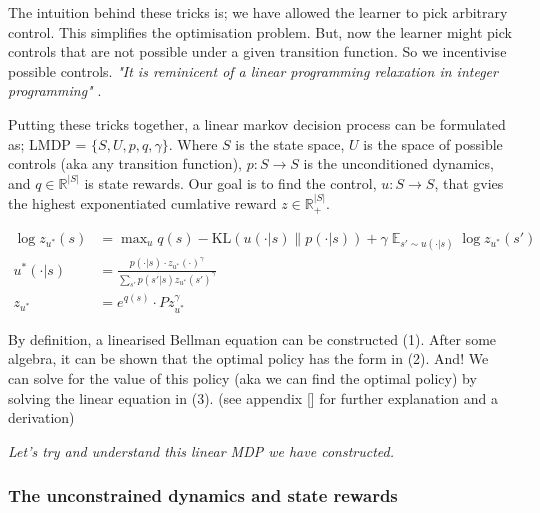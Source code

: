 The intuition behind these tricks is; we have allowed the learner to pick arbitrary control.
This simplifies the optimisation problem. But, now the learner might pick controls that are not possible
under a given transition function. So we incentivise possible controls.
\textit{"It is reminicent of a linear programming relaxation in integer programming"} \cite{Todorov}.



Putting these tricks together, a linear markov decision process can be formulated as;
LMDP = $\{S, U, p, q, \gamma\}$. Where $S$ is the state space, $U$ is the space of possible controls (aka any transition function),
$p: S \to S$ is the unconditioned dynamics, and $q \in \mathbb R^{|S|}$ is state rewards.
Our goal is to find the control, $u: S \to S$, that gvies the highest exponentiated cumlative reward $z \in \mathbb R_+^{|S|}$.

\begin{align}
\log z_{u^{* }}(s) &= \mathop{\text{max}}_{u} q(s) - \text{KL}(u(\cdot| s) \parallel p(\cdot | s)) + \gamma \mathop{\mathbb E}_{s' \sim u(\cdot | s)} \log z_{u^{* }}(s') \tag{1}\\
u^{* }(\cdot | s) &= \frac{p(\cdot | s)\cdot z_{u^{* }}(\cdot)^{\gamma}}{\sum_{s'} p(s' | s) z_{u^{* }}(s')^{\gamma}} \tag{2}\\
z_{u^{* }} &= e^{q(s)}\cdot P z_{u^{* }}^{\gamma} \tag{3}
\end{align}

By definition, a linearised Bellman equation can be constructed (1). After some algebra,
it can be shown that the optimal policy has the form in (2).
And! We can solve for the value of this policy (aka we can find the optimal policy)
by solving the linear equation in (3). (see appendix [] for further explanation and a derivation)

\begin{displayquote}
\textit{Let's try and understand this linear MDP we have constructed.}
\end{displayquote}

\subsubsection{\color{red}The unconstrained dynamics and state rewards}

